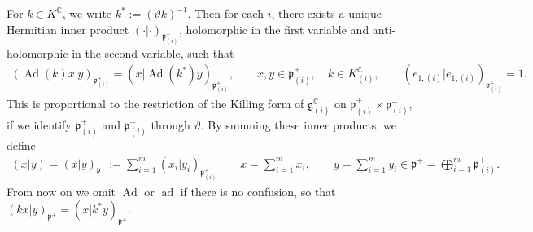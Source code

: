 \documentclass[pdftex]{sigma}
\numberwithin{equation}{section}
\newcommand{\BC}{\mathbb{C}}
\newcommand{\fg}{\mathfrak{g}}
\newcommand{\fp}{\mathfrak{p}}
\begin{document}
For $k\in K^\BC$, we write $k^*:=(\vartheta k)^{-1}$.
Then for each $i$, there exists a unique Hermitian inner product $(\cdot|\cdot)_{\fp^+_{(i)}}$,
holomorphic in the first variable and anti-holomorphic in the second variable, such that
\begin{gather*}
(\operatorname{Ad}(k)x|y)_{\fp^+_{(i)}} =(x|\operatorname{Ad}(k^*)y)_{\fp^+_{(i)}}, \qquad x,y\in\fp^+_{(i)},\quad k\in K^\BC_{(i)},\qquad
(e_{1,(i)}|e_{1,(i)})_{\fp^+_{(i)}} =1.
\end{gather*}
This is proportional to the restriction of the Killing form of $\fg_{(i)}^\BC$ on $\fp^+_{(i)}\times \fp^-_{(i)}$,
if we identify $\fp^+_{(i)}$ and $\fp^-_{(i)}$ through $\vartheta$. By summing these inner products, we define
\begin{gather}\label{innerprod}
(x|y)=(x|y)_{\fp^+}:=\sum_{i=1}^m (x_i|y_i)_{\fp^+_{(i)}} \qquad
 x=\sum_{i=1}^m x_i, \qquad y=\sum_{i=1}^m y_i\in\fp^+=\bigoplus_{i=1}^m\fp^+_{(i)} .
\end{gather}
From now on we omit $\operatorname{Ad}$ or $\operatorname{ad}$ if there is no confusion, so that $(kx|y)_{\fp^+}=(x|k^*y)_{\fp^+}$.
\end{document}
